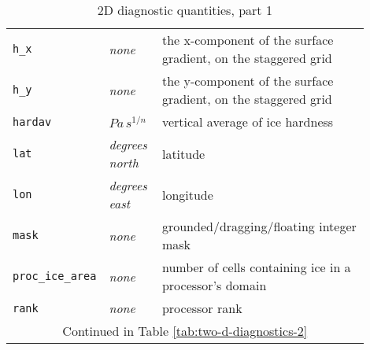 \begin{table}[ht]
\begin{tabular}{p{0.15\linewidth}p{0.15\linewidth}p{0.6\linewidth}}
    \texttt{h_x} & \textsl{none} &  the x-component of the surface gradient, on the staggered grid\\
    \texttt{h_y} & \textsl{none} &  the y-component of the surface gradient, on the staggered grid\\
    \texttt{hardav} & $Pa\, s^{1/n}$ &  vertical average of ice hardness \\
    \texttt{lat} & \textsl{degrees north} & latitude \\
    \texttt{lon} & \textsl{degrees east} & longitude \\
    \texttt{mask} & \textsl{none} & grounded/dragging/floating integer mask \\
    \texttt{proc_ice_area} & \textsl{none} &  number of cells containing ice in a processor's domain \\
    \texttt{rank} & \textsl{none} &  processor rank \\
   \multicolumn{3}{c}{Continued in Table \ref{tab:two-d-diagnostics-2}}\\
  \bottomrule
  \end{tabular}
  \caption{2D diagnostic quantities, part 1}
  \label{tab:two-d-diagnostics-1}
\end{table}

